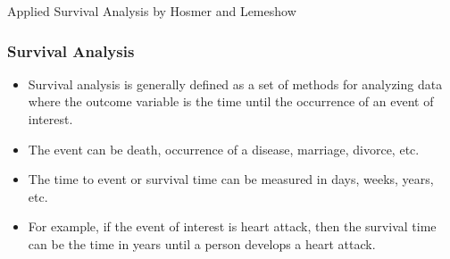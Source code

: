
Applied Survival Analysis by Hosmer and Lemeshow
\begin{frame}[fragile]
	
\frametitle{Survival Analysis}

\begin{itemize}
\item Survival analysis is generally defined as a set of methods for analyzing data where the outcome variable
is the time until the occurrence of an event of interest. 
\item The event can be death, occurrence of a disease,
marriage, divorce, etc. 
\item The time to event or survival time can be measured in days, weeks, years, etc.
\item For example, if the event of interest is heart attack, then the survival time can be the time in years until a
person develops a heart attack.
\end{itemize}
\end{frame}

